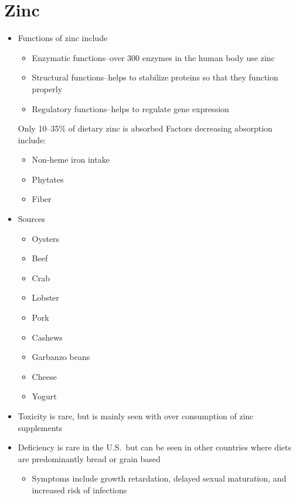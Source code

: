 \documentclass[title={Chapter 9}]{fdsn201notes}
\begin{document}
\section{Zinc}\label{sec:Zinc}
\begin{itemize}
	\item Functions of zinc include
	\begin{itemize}
		\item Enzymatic functions--over 300 enzymes in the human body use zinc
		\item Structural functions--helps to stabilize proteins so that they function properly
		\item Regulatory functions--helps to regulate gene expression
	\end{itemize}
	Only 10--35\% of dietary zinc is absorbed
	Factors decreasing absorption include:
	\begin{itemize}
		\item Non-heme iron intake
		\item Phytates
		\item Fiber
	\end{itemize}
	\item Sources
	\begin{itemize}
		\item Oysters
		\item Beef
		\item Crab
		\item Lobster
		\item Pork
		\item Cashews
		\item Garbanzo beans
		\item Cheese
		\item Yogurt
	\end{itemize}
	\item Toxicity is rare, but is mainly seen with over consumption of zinc supplements
	\item Deficiency is rare in the U.S.\ but can be seen in other countries where diets are predominantly bread or grain based
	\begin{itemize}
		\item Symptoms include growth retardation, delayed sexual maturation, and increased risk of infections
	\end{itemize}
\end{itemize}
\end{document}
